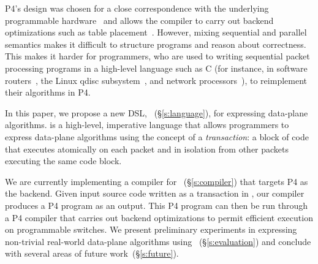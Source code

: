P4's design was chosen for a close correspondence with the underlying
programmable hardware~\cite{flexpipe, rmt} and allows the compiler to carry out
backend optimizations such as table placement~\cite{lavanya_compiler}.
However, mixing sequential and parallel semantics makes it difficult to
structure programs and reason about correctness. This makes it harder for
programmers, who are used to writing sequential packet processing programs in a
high-level language such as C (for instance, in software routers~\cite{click,
intel_multicore}, the Linux qdisc subsystem~\cite{qdisc}, and network
processors~\cite{npu}), to reimplement their algorithms in P4.

In this paper, we propose a new DSL, \pktlanguage~(\S\ref{s:language}), for
expressing data-plane algorithms. \pktlanguage is a high-level, imperative
language that allows programmers to express data-plane algorithms using the
concept of a {\em transaction}: a block of code that executes atomically on
each packet and in isolation from other packets executing the same code block.


%

We are currently implementing a compiler for \pktlanguage~(\S\ref{s:compiler})
that targets P4 as the backend. Given input source code written as a
transaction in \pktlanguage, our compiler produces a P4 program as an output.
This P4 program can then be run through a P4 compiler that carries out backend
optimizations to permit efficient execution on programmable switches.  We
present preliminary experiments in expressing non-trivial real-world data-plane
algorithms using \pktlanguage~(\S\ref{s:evaluation}) and conclude with several
areas of future work~(\S\ref{s:future}).
